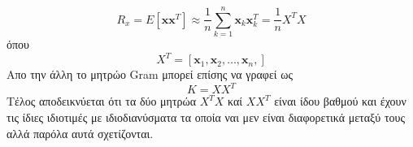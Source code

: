 \newline\hspace*{\fill}
\begin{equation}
        R_{x} = E[\mathbf{x}\mathbf{x}^{T}] \approx \dfrac{1}{n} \sum_{k=1}^{n} \mathbf{x}_{k}\mathbf{x}_{k}^{T} = \dfrac{1}{n} X^{T}X
\end{equation}
\hspace*{\fill}\newline
όπου 
\newline\hspace*{\fill}
\begin{equation}
        X^{Τ} = [\mathbf{x}_{1},\mathbf{x}_{2},\ldots,\mathbf{x}_{n},]
\end{equation}
\hspace*{\fill}\newline
Απο την άλλη το μητρώο \textlatin{Gram} μπορεί επίσης να γραφεί ως 
\newline\hspace*{\fill}
\begin{equation}
        K = XX^{T}
\end{equation}
\hspace*{\fill}\newline
Τέλος αποδεικνύεται ότι τα δύο μητρώα $X^{T}X$ καί $XX^{T}$ είναι ίδου βαθμού και έχουν τις ίδιες ιδιοτιμές με ιδιοδιανύσματα τα οποία ναι μεν είναι διαφορετικά μεταξύ τους αλλά παρόλα αυτά σχετίζονται.

